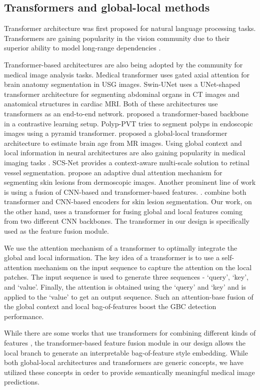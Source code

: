 \documentclass[twocolumn,final]{elsarticle}
\begin{document}
\subsection{Transformers and global-local methods}
%
Transformer architecture was first proposed \citep{vaswani2017attention} for natural language processing tasks. Transformers are gaining popularity in the vision community due to their superior ability to model long-range dependencies \citep{dosovitskiy2020image, touvron2021training, shao2021temporal}. 
\par Transformer-based architectures are also being adopted  by the community for medical image analysis tasks. Medical transformer \citep{valanarasu2021medical} uses gated axial attention for brain anatomy segmentation in USG images. Swin-UNet \citep{cao2021swin} uses a UNet-shaped transformer architecture for segmenting abdominal organs in CT images and anatomical structures in cardiac MRI. Both of these architectures use transformers as an end-to-end network. \cite{wang2022transformer} proposed a transformer-based backbone in a contrastive learning setup. Polyp-PVT \citep{dong2021polyp} tries to segment polyps in endoscopic images using a pyramid transformer. \cite{he2021global} proposed a global-local transformer architecture to estimate brain age from MR images. 
Using global context and local information in neural architectures are also gaining popularity in medical imaging tasks \citep{guo2019deep, van2021hooknet, wu2021region, wu2022cross}. SCS-Net \citep{wu2021scs} provides a context-aware multi-scale solution to retinal vessel segmentation. \cite{wu2020automated} propose an adaptive dual attention mechanism for segmenting skin lesions from dermoscopic images.
Another prominent line of work is using a fusion of CNN-based and transformer-based features. \citep{chen2021transunet, wang2021transbts}. \cite{wu2022fat} combine both transformer and CNN-based encoders for skin lesion segmentation. Our work, on the other hand, uses a transformer for fusing global and local features coming from two different CNN backbones. The transformer in our design is specifically used as the feature fusion module.
\par We use the attention mechanism of a transformer \citep{vaswani2017attention} to optimally integrate the global and local information. The key idea of a transformer is to use a self-attention mechanism on the input sequence to capture the attention on the local patches. The input sequence is used to generate three sequences - `query', `key', and `value'. Finally, the attention is obtained using the `query' and `key' and is applied to the `value' to get an output sequence. Such an attention-base fusion of the global context and local bag-of-features boost the GBC detection performance.
\par While there are some works that use transformers for combining different kinds of features \citep{xia2021effective, he2021global}, the transformer-based feature fusion module in our design allows the local branch to generate an interpretable bag-of-feature style embedding. While both global-local architectures and transformers are generic concepts, we have utilized these concepts in order to provide semantically meaningful medical image predictions. 
\end{document}
